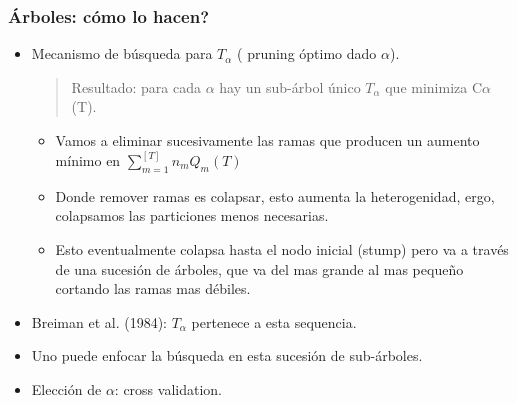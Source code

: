 \documentclass[
  shownotes,
  xcolor={svgnames},
  hyperref={colorlinks,citecolor=DarkBlue,linkcolor=DarkRed,urlcolor=DarkBlue}
  , aspectratio=169]{beamer}
\begin{document}
\begin{frame}[fragile]
\frametitle{Árboles: cómo lo hacen?}

\begin{itemize}
  \item Mecanismo de búsqueda para $T_\alpha$ ( pruning óptimo dado  $\alpha$).


    \begin{quote}
    \centering
    Resultado: para cada  $\alpha$ hay un sub-árbol único  $T_\alpha$ que minimiza  C$\alpha$ (T).
    \end{quote}

\begin{itemize}

\medskip
\item Vamos a eliminar sucesivamente las ramas que producen un aumento mínimo en  $\sum_{m=1}^{[T]} n_m  Q_m (T)$
\medskip
\item Donde remover ramas es colapsar, esto aumenta la heterogenidad, ergo, colapsamos las particiones menos necesarias.
\medskip
\item Esto eventualmente colapsa hasta el nodo inicial (stump) pero va a través de una sucesión de árboles, que va del mas grande al mas pequeño cortando las ramas mas débiles.
\end{itemize}
\medskip
\item Breiman et al. (1984): $T_\alpha$ pertenece a esta sequencia. 
\medskip
\item Uno puede enfocar la búsqueda en esta sucesión de sub-árboles.
\medskip
\item Elección de $\alpha$: cross validation.


\end{itemize}




\end{frame}
\end{document}
